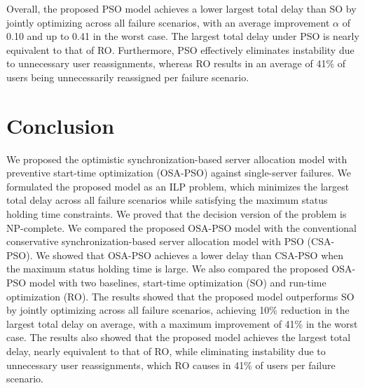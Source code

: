 \documentclass[conference]{IEEEtran}
\begin{document}
\begin{CJK}{UTF8}{ipxm}

Overall, the proposed PSO model achieves a lower largest total delay than SO by jointly optimizing across all failure scenarios, with an average improvement $\alpha$ of 0.10 and up to 0.41 in the worst case.
The largest total delay under PSO is nearly equivalent to that of RO.
Furthermore, PSO effectively eliminates instability due to unnecessary user reassignments, whereas RO results in an average of 41\% of users being unnecessarily reassigned per failure scenario.

\section{Conclusion}
\label{sec:conclusion}

We proposed the optimistic synchronization-based server allocation model with preventive start-time optimization (OSA-PSO) against single-server failures.
We formulated the proposed model as an ILP problem, which minimizes the largest total delay across all failure scenarios while satisfying the maximum status holding time constraints.
We proved that the decision version of the problem is NP-complete.
We compared the proposed OSA-PSO model with the conventional conservative synchronization-based server allocation model with PSO (CSA-PSO). We showed that OSA-PSO achieves a lower delay than CSA-PSO when the maximum status holding time is large.
We also compared the proposed OSA-PSO model with two baselines, start-time optimization (SO) and run-time optimization (RO).
The results showed that the proposed model outperforms SO by jointly optimizing across all failure scenarios, achieving 10\% reduction in the largest total delay on average, with a maximum improvement of 41\% in the worst case.
The results also showed that the proposed model achieves the largest total delay, nearly equivalent to that of RO, while eliminating instability due to unnecessary user reassignments, which RO causes in 41\% of users per failure scenario.



\end{CJK}
\end{document}
